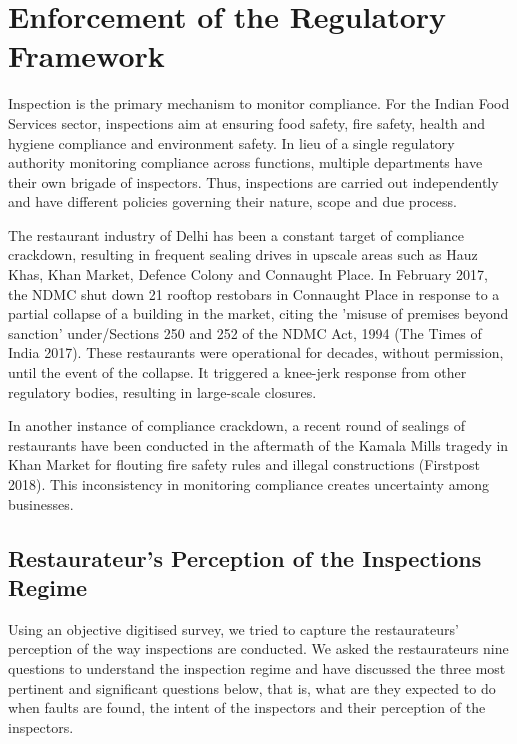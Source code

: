 \documentclass[a4paper, 12pt]{article}
\begin{document}
		

	
		\section{Enforcement of the Regulatory Framework}
		\label{sec:2}
		
		Inspection is the primary mechanism to monitor compliance. For the Indian Food Services sector, inspections aim at ensuring food safety, fire safety, health and hygiene compliance and environment safety. In lieu of a single regulatory authority 
monitoring compliance across functions, multiple departments have their own brigade of inspectors. Thus, inspections are carried out independently and have different policies governing their nature, scope and due process.
		
		The restaurant industry of Delhi has been a constant target of compliance crackdown, resulting in frequent sealing drives in upscale areas such as Hauz Khas, Khan Market, Defence Colony and Connaught Place. In February 2017, the NDMC shut down 
21 rooftop restobars in Connaught Place in response to a partial collapse of a building in the market, citing the 'misuse of premises beyond sanction' under/Sections 250 and 252 of the NDMC Act, 1994 (The Times of India 2017). These restaurants were 
operational for decades, without permission, until the event of the collapse. It triggered a knee-jerk response from other regulatory bodies, resulting in large-scale closures.
		
		In another instance of compliance crackdown, a recent round of sealings of restaurants have been conducted in the aftermath of the Kamala Mills tragedy in Khan Market for flouting fire safety rules and illegal constructions (Firstpost 2018). This 
inconsistency in monitoring compliance creates uncertainty among businesses.
		
		\subsection{Restaurateur’s Perception of the Inspections Regime}
		Using an objective digitised survey, we tried to capture the restaurateurs’ perception of the way inspections are conducted. We asked the restaurateurs nine questions to understand the inspection regime and have discussed the three most pertinent and 
significant questions below, that is, what are they expected to do when faults are found, the intent of the inspectors and their perception of the inspectors.
		
\end{document}
